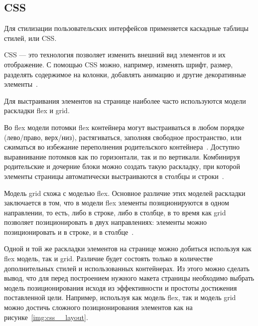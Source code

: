 \subsection{CSS}

Для стилизации пользовательских интерфейсов применяется каскадные таблицы стилей, или CSS.

CSS --- это технология позволяет изменить внешний вид элементов и их отображение. С помощью CSS можно, например, изменять шрифт, размер, разделять содержимое на колонки, добавлять анимацию и другие декоративные элементы~\cite{mdn}.

Для выстраивания элементов на странице наиболее часто используются модели раскладки flex и grid.

Во flex модели потомки flex контейнера могут выстраиваться в любом порядке (лево/право, верх/низ), растягиваться, заполняя свободное пространство, или сжиматься во избежание переполнения родительского контейнера~\cite{mdn}. Доступно выравнивание потомков как по горизонтали, так и по вертикали. Комбинируя родительские и дочерние блоки можно создать такую раскладку, при которой элементы страницы автоматически выстраиваются в столбцы и строки~\cite{mdn}.

Модель grid схожа с моделью flex. Основное различие этих моделей раскладки заключается в том, что в модели flex элементы позиционируются в одном направлении, то есть, либо в строке, либо в столбце, в то время как grid позволяет позиционировать в двух направлениях: элементы можно позиционировать и в строке, и в столбце~\cite{mdn}.

Одной и той же раскладки элементов на странице можно добиться используя как flex модель, так и grid. Различие будет состоять только в количестве дополнительных стилей и использованных контейнерах. Из этого можно сделать вывод, что для перед построением нужного макета страницы необходимо выбрать модель позиционирования исходя из эффективности и простоты достижения поставленной цели. Например, используя как модель flex, так и модель grid можно достичь сложного позиционирования элементов как на рисунке~\ref{img:css__layout}.

